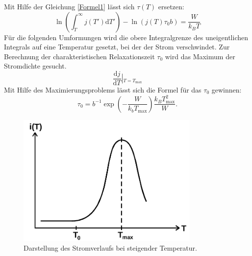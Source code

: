 Mit Hilfe der Gleichung \eqref{Formel1} lässt sich $\tau(T)$ ersetzen:
\begin{equation}
    \label{Formel7}
\ln(\int_T^\infty j(T')\text{d}T')-\ln(j(T)\tau_0 b)=\frac{W}{k_BT}
\end{equation}
Für die folgenden Umformungen wird die obere Integralgrenze
des uneigentlichen Integrals auf eine Temperatur gesetzt, bei der der Strom
verschwindet. Zur Berechnung der charakteristischen Relaxationszeit
$\tau_0$ wird das Maximum der Stromdichte gesucht.
$$ \frac{\text{d}j}{\text{d}T}\left|_{T=T_\text{max}} \right.$$
Mit Hilfe des Maximierungsproblems lässt sich die Formel für das $\tau_0$
gewinnen:
\begin{equation}
    \label{Formel8}
    \tau_0=b^{-1}\exp \left(-\frac{W}{k_b T_{\text{max}}}\right)
            \frac{k_BT^2_\text{max}}{W}.
\end{equation}

\begin{figure}
\centering
\includegraphics[width=0.8\textwidth]{ressources/stromfluss.png}
\caption{Darstellung des Stromverlaufs bei steigender Temperatur. \cite{skript}}
\label{theo1}
\end{figure}



